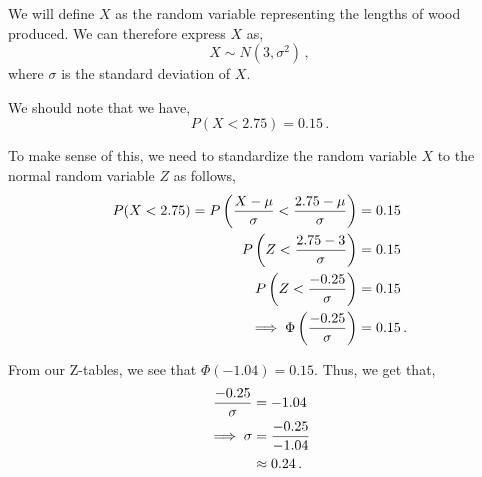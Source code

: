 %
%


\begin{subquestions}

\subquestion

We will define $X$ as the random variable representing the lengths of wood produced. We can therefore express $X$ as,
\begin{equation}
	X \sim N(3, \sigma^2) \,,
\end{equation}	
where $\sigma$ is the standard deviation of $X$.
	
\begin{subsubquestions}
	
\subsubquestion

We should note that we have,
\begin{equation}
	P(X<2.75) = 0.15 \,.
\end{equation}
	
To make sense of this, we need to standardize the random variable $X$ to the normal random variable $Z$ as follows,
\begin{align}
	P(X<2.75) = P\left(\frac{X - \mu}{\sigma}<\frac{2.75-\mu}{\sigma}\right) & = 0.15 \nonumber \\
	            P\left(Z <\frac{2.75-3}{\sigma}\right) & = 0.15 \nonumber \\
	            P\left(Z <\frac{-0.25}{\sigma}\right) & = 0.15 \nonumber \\
	            \implies \Phi\left(\frac{-0.25}{\sigma}\right) & = 0.15 \,.
\end{align}

From our Z-tables, we see that $\Phi(-1.04)=0.15$. Thus, we get that,
\begin{align}
	\frac{-0.25}{\sigma} & = -1.04 \nonumber \\
	\implies \sigma & = \frac{-0.25}{-1.04} \nonumber \\
	                & \approx 0.24 \,.
\end{align}


\end{subsubquestions}
\end{subquestions}
